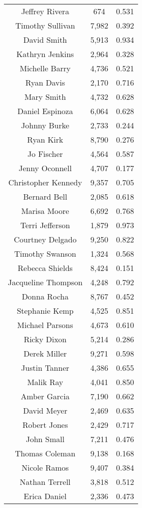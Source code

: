 \begin{longtable}{ccc}
  Jeffrey Rivera & 674 & 0.531 \\
  Timothy Sullivan & 7,982 & 0.392 \\
  David Smith & 5,913 & 0.934 \\
  Kathryn Jenkins & 2,964 & 0.328 \\
  Michelle Barry & 4,736 & 0.521 \\
  Ryan Davis & 2,170 & 0.716 \\
  Mary Smith & 4,732 & 0.628 \\
  Daniel Espinoza & 6,064 & 0.628 \\
  Johnny Burke & 2,733 & 0.244 \\
  Ryan Kirk & 8,790 & 0.276 \\
  Jo Fischer & 4,564 & 0.587 \\
  Jenny Oconnell & 4,707 & 0.177 \\
  Christopher Kennedy & 9,357 & 0.705 \\
  Bernard Bell & 2,085 & 0.618 \\
  Marisa Moore & 6,692 & 0.768 \\
  Terri Jefferson & 1,879 & 0.973 \\
  Courtney Delgado & 9,250 & 0.822 \\
  Timothy Swanson & 1,324 & 0.568 \\
  Rebecca Shields & 8,424 & 0.151 \\
  Jacqueline Thompson & 4,248 & 0.792 \\
  Donna Rocha & 8,767 & 0.452 \\
  Stephanie Kemp & 4,525 & 0.851 \\
  Michael Parsons & 4,673 & 0.610 \\
  Ricky Dixon & 5,214 & 0.286 \\
  Derek Miller & 9,271 & 0.598 \\
  Justin Tanner & 4,386 & 0.655 \\
  Malik Ray & 4,041 & 0.850 \\
  Amber Garcia & 7,190 & 0.662 \\
  David Meyer & 2,469 & 0.635 \\
  Robert Jones & 2,429 & 0.717 \\
  John Small & 7,211 & 0.476 \\
  Thomas Coleman & 9,138 & 0.168 \\
  Nicole Ramos & 9,407 & 0.384 \\
  Nathan Terrell & 3,818 & 0.512 \\
  Erica Daniel & 2,336 & 0.473 \\

\end{longtable}
